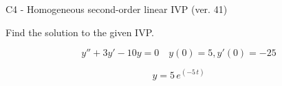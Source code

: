 \begin{exercise}
  \begin{exerciseTitle}C4 - Homogeneous second-order linear IVP (ver. 41)\end{exerciseTitle}
  \begin{exerciseStatement}
    
Find the solution to the given IVP.

    
\[y''+3y'-10y = 0 \hspace{1em} y(0) = 5 , y'(0) = -25\]

  \end{exerciseStatement}
  \begin{exerciseAnswer}
    
\[y= 5 \, e^{\left(-5 \, t\right)}\]

  \end{exerciseAnswer}
\end{exercise}